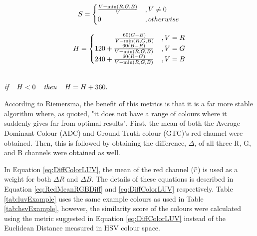 \begin{equation}
\label{eq:RGBHSVconversion2}
S = \begin{cases}\frac{V - \min(R,G,B)}{V} & , V \neq 0\\ 
0 & , otherwise \end{cases} \\
\end{equation}

\begin{equation}
\label{eq:RGBHSVconversion3}
H = \begin{cases}
\hspace{2.8em} \frac{60(G-B)}{V-\min(R,G,B)} & ,V = R\\
120 + \frac{60(B-R)}{V-\min(R,G,B)} & ,V = G\\
240 + \frac{60(R-G)}{V-\min(R,G,B)} & ,V = B 
\end{cases}
\end{equation}

\centerline{\\$\textit{if } \hspace{.8em}H< 0 \hspace{.8em}\textit{ then } \hspace{.8em}H = H+360.$}











According to Riemersma, the benefit of this metrics is that it is a far more stable algorithm where, as quoted, "it does not have a range of colours where it suddenly gives far from optimal results". First, the mean of both the Average Dominant Colour (ADC) and Ground Truth colour (GTC)'s red channel were obtained. Then, this is followed by obtaining the difference, $\Delta$, of all three R, G, and B channels were obtained as well. 

In Equation \ref{eq:DiffColorLUV}, the mean of the red channel ($\bar{r}$) is used as a weight for both $\Delta{R}$ and $\Delta{B}$. The details of these equations is described in Equation \ref{eq:RedMeanRGBDiff} and \ref{eq:DiffColorLUV} respectively. Table \ref{tab:luvExample} uses the same example colours as used in Table \ref{tab:hsvExample}, however, the similarity score of the colours were calculated using the metric suggested in Equation \ref{eq:DiffColorLUV} instead of the Euclidean Distance measured in HSV colour space.


